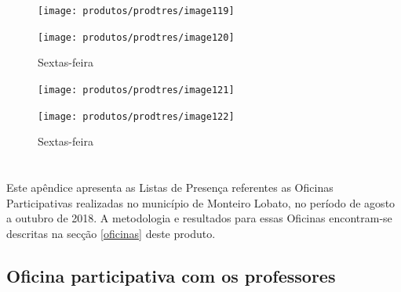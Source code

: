 \FloatBarrier


\begin{landscape}
	
	\begin{figure}[h]
		\centering
		\caption*{Sextas-feira}
		\begin{minipage}{1.4\textwidth}
			\centering
			\label{fig:image119}
			\texttt{[image: produtos/prodtres/image119]}
		\end{minipage}
		\begin{minipage}{1.4\textwidth}
			\centering
			\texttt{[image: produtos/prodtres/image120]}
			\label{fig:image120}
		\end{minipage}
	\end{figure}
	
	\begin{figure}[h]
		\centering
		\caption*{Sextas-feira}
		\begin{minipage}{1.4\textwidth}
			\centering
			\label{fig:image121}
			\texttt{[image: produtos/prodtres/image121]}
		\end{minipage}
		\begin{minipage}{1.4\textwidth}
			\centering
			\texttt{[image: produtos/prodtres/image122]}
			\label{fig:image122}
		\end{minipage}
	\end{figure}
	
\end{landscape}

\FloatBarrier

\chapter{}

Este apêndice apresenta as Listas de Presença referentes as Oficinas Participativas realizadas no município de Monteiro Lobato, no período de agosto a outubro de 2018. A metodologia e resultados para essas Oficinas encontram-se descritas na secção \ref{oficinas} deste produto.

\newpage
\section{Oficina participativa com os professores}

